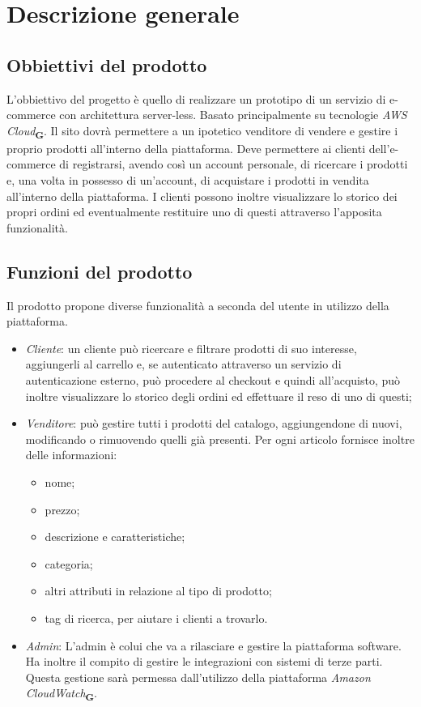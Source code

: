 \section{Descrizione generale}
\subsection{Obbiettivi del prodotto}
L'obbiettivo del progetto è quello di realizzare un prototipo di un servizio di e-commerce con architettura server-less. Basato principalmente su tecnologie \textit{AWS Cloud}\textsubscript{\textbf{G}}. Il sito dovrà permettere a un ipotetico venditore di vendere e gestire i proprio prodotti all'interno della piattaforma. Deve permettere ai clienti dell'e-commerce di registrarsi, avendo così un account personale, di ricercare i prodotti e, una volta in possesso di un'account, di acquistare i prodotti in vendita all'interno della piattaforma. I clienti possono inoltre visualizzare lo storico dei propri ordini ed eventualmente restituire uno di questi attraverso l'apposita funzionalità.
\subsection{Funzioni del prodotto}
Il prodotto propone diverse funzionalità a seconda del utente in utilizzo della piattaforma.
\begin{itemize}
    \item \textit{Cliente}: un cliente può ricercare e filtrare prodotti di suo interesse, aggiungerli al carrello e, se autenticato attraverso un servizio di autenticazione esterno, può procedere al checkout e quindi all'acquisto, può inoltre visualizzare lo storico degli ordini ed effettuare il reso di uno di questi;
    \item \textit{Venditore}: può gestire tutti i prodotti del catalogo, aggiungendone di nuovi, modificando o rimuovendo quelli già presenti. Per ogni articolo fornisce inoltre delle  informazioni:
    \begin{itemize}
        \item nome;
        \item prezzo;
        \item descrizione e caratteristiche;
        \item categoria;
        \item altri attributi in relazione al tipo di prodotto;
        \item tag di ricerca, per aiutare i clienti a trovarlo.
    \end{itemize}
    \item \textit{Admin}: L'admin è colui che va a rilasciare e gestire la piattaforma software. Ha inoltre il compito di gestire le integrazioni con sistemi di terze parti. Questa gestione sarà permessa dall'utilizzo della piattaforma \textit{Amazon CloudWatch}\textsubscript{\textbf{G}}.
\end{itemize}
